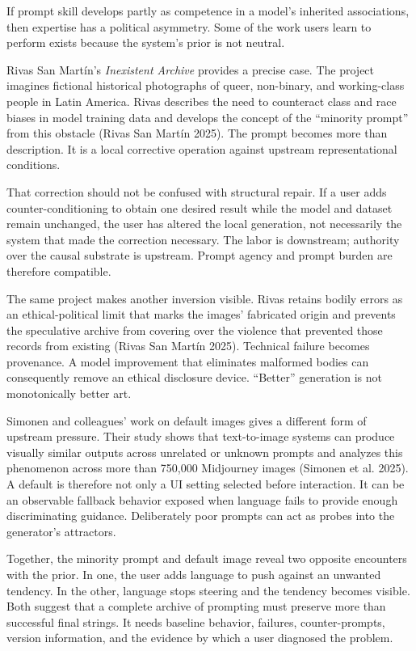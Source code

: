 \documentclass[
  11pt,
  letterpaper,
]{article}
\begin{document}
If prompt skill develops partly as competence in a model's inherited
associations, then expertise has a political asymmetry. Some of the work
users learn to perform exists because the system's prior is not neutral.

Rivas San Martín's \emph{Inexistent Archive} provides a precise case.
The project imagines fictional historical photographs of queer,
non-binary, and working-class people in Latin America. Rivas describes
the need to counteract class and race biases in model training data and
develops the concept of the ``minority prompt'' from this obstacle
(Rivas San Martín 2025). The prompt becomes more than description. It is
a local corrective operation against upstream representational
conditions.

That correction should not be confused with structural repair. If a user
adds counter-conditioning to obtain one desired result while the model
and dataset remain unchanged, the user has altered the local generation,
not necessarily the system that made the correction necessary. The labor
is downstream; authority over the causal substrate is upstream. Prompt
agency and prompt burden are therefore compatible.

The same project makes another inversion visible. Rivas retains bodily
errors as an ethical-political limit that marks the images' fabricated
origin and prevents the speculative archive from covering over the
violence that prevented those records from existing (Rivas San Martín
2025). Technical failure becomes provenance. A model improvement that
eliminates malformed bodies can consequently remove an ethical
disclosure device. ``Better'' generation is not monotonically better
art.

Simonen and colleagues' work on default images gives a different form of
upstream pressure. Their study shows that text-to-image systems can
produce visually similar outputs across unrelated or unknown prompts and
analyzes this phenomenon across more than 750,000 Midjourney images
(Simonen et al. 2025). A default is therefore not only a UI setting
selected before interaction. It can be an observable fallback behavior
exposed when language fails to provide enough discriminating guidance.
Deliberately poor prompts can act as probes into the generator's
attractors.

Together, the minority prompt and default image reveal two opposite
encounters with the prior. In one, the user adds language to push
against an unwanted tendency. In the other, language stops steering and
the tendency becomes visible. Both suggest that a complete archive of
prompting must preserve more than successful final strings. It needs
baseline behavior, failures, counter-prompts, version information, and
the evidence by which a user diagnosed the problem.
\end{document}
